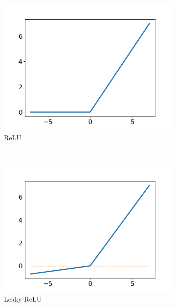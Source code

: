 \begin{figure}
  \centering
  \begin{subfigure}[t]{0.3\textwidth}
    \includegraphics[width=\textwidth]{files/figs/backg/relu.png}
    \caption{ReLU}
    \label{fig:relu}
  \end{subfigure}
  ~
  \begin{subfigure}[t]{0.3\textwidth}
    \includegraphics[width=\textwidth]{files/figs/backg/leaky_relu.png}
    \caption{Leaky-ReLU}
    \label{fig:leaky-relu}
  \end{subfigure}
  ~
  \begin{subfigure}[t]{0.3\textwidth}

\end{subfigure}
\end{figure}
